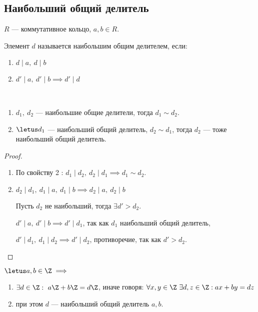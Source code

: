 \subsection{Наибольший общий делитель}

\begin{defn}
    $R$ --- коммутативное кольцо, $a, b \in R$.

    Элемент $d$ называется наибольшим общим делителем, если:

    \begin{enumerate}
        \item $d \mid a,~ d \mid b$
        \item $d' \mid a,~ d' \mid b \implies d' \mid d$
    \end{enumerate}
\end{defn}

\begin{theorem-non}~
    \begin{enumerate}
        \item $d_1,~ d_2$ --- наибольшие общие делители, тогда $d_1 \sim d_2$.
        
        \item $\letus d_1$ --- наибольший общий делитель, $d_2 \sim d_1$, тогда $d_2$ --- тоже наибольший общий делитель.
    \end{enumerate}
\end{theorem-non}

\begin{proof}
    \begin{enumerate}
        \item По свойству 2 : $d_1 \mid d_2,~d_2 \mid d_1 \implies d_1 \sim d_2$.
        
        \item $d_2 \mid d_1,~d_1 \mid a,~d_1 \mid b \implies d_2 \mid a,~d_2 \mid b$
        
        Пусть $d_2$ не наибольший, тогда $\exists d' > d_2$.
        
        $d' \mid a,~d' \mid b \implies d' \mid d_1$, так как $d_1$ наибольший общий делитель,
        
        $d' \mid d_1,~d_1 \mid d_2 \implies d' \mid d_2$, противоречие, так как $d' > d_2$.
    \end{enumerate}
\end{proof}

\begin{theorem-non} 
    $\letus a, b \in \Z \implies$
    
    \begin{enumerate}
        \item $\exists d \in \Z:~a\Z + b\Z = d\Z$, иначе говоря: $\forall x, y \in \Z \ \exists d, z \in \Z: ax + by = dz$
        
        \item при этом $d$ --- наибольший общий делитель $a, b$.
    \end{enumerate}
\end{theorem-non}

